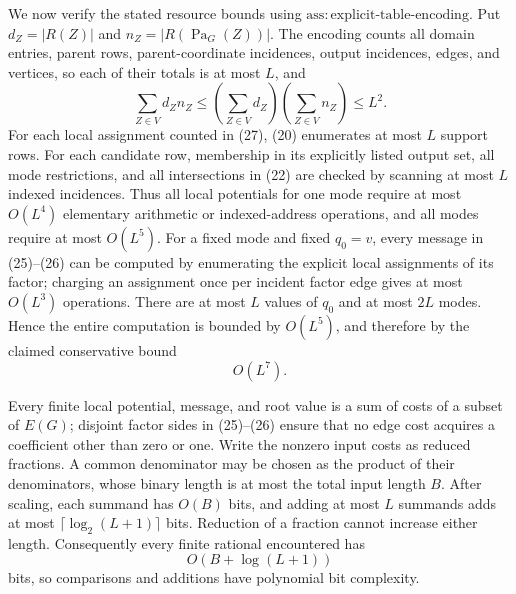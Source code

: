 We now verify the stated resource bounds using \(\mathrm{ass:explicit\mbox{-}table\mbox{-}encoding}\).  Put \(d_Z=|R(Z)|\) and \(n_Z=|R(\operatorname{Pa}_G(Z))|\).  The encoding counts all domain entries, parent rows, parent-coordinate incidences, output incidences, edges, and vertices, so each of their totals is at most \(L\), and
\[
 \sum_{Z\in V}d_Zn_Z
 \le \left(\sum_{Z\in V}d_Z\right)
      \left(\sum_{Z\in V}n_Z\right)
 \le L^2.                                                             \tag{27}
\]
For each local assignment counted in (27), (20) enumerates at most \(L\) support rows.  For each candidate row, membership in its explicitly listed output set, all mode restrictions, and all intersections in (22) are checked by scanning at most \(L\) indexed incidences.  Thus all local potentials for one mode require at most \(O(L^4)\) elementary arithmetic or indexed-address operations, and all modes require at most \(O(L^5)\).  For a fixed mode and fixed \(q_0=v\), every message in (25)--(26) can be computed by enumerating the explicit local assignments of its factor; charging an assignment once per incident factor edge gives at most \(O(L^3)\) operations.  There are at most \(L\) values of \(q_0\) and at most \(2L\) modes.  Hence the entire computation is bounded by \(O(L^5)\), and therefore by the claimed conservative bound
\[
 O(L^7).                                                              \tag{28}
\]

Every finite local potential, message, and root value is a sum of costs of a subset of \(E(G)\); disjoint factor sides in (25)--(26) ensure that no edge cost acquires a coefficient other than zero or one.  Write the nonzero input costs as reduced fractions.  A common denominator may be chosen as the product of their denominators, whose binary length is at most the total input length \(B\).  After scaling, each summand has \(O(B)\) bits, and adding at most \(L\) summands adds at most \(\lceil\log_2(L+1)\rceil\) bits.  Reduction of a fraction cannot increase either length.  Consequently every finite rational encountered has
\[
 O(B+\log(L+1))                                                       \tag{29}
\]
bits, so comparisons and additions have polynomial bit complexity.

